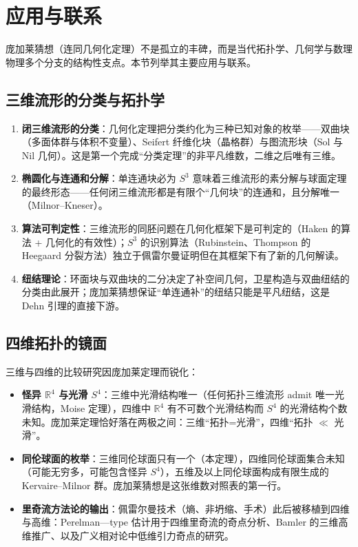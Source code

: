 \section{应用与联系}\label{sec:applications}

庞加莱猜想（连同几何化定理）不是孤立的丰碑，而是当代拓扑学、几何学与数理物理多个分支的结构性支点。本节列举其主要应用与联系。

\subsection{三维流形的分类与拓扑学}

\begin{enumerate}[label=(\arabic*)]
    \item \textbf{闭三维流形的分类}：几何化定理把分类约化为三种已知对象的枚举——双曲块（多面体群与体积不变量）、Seifert 纤维化块（晶格群）与图流形块（Sol 与 Nil 几何）。这是第一个完成“分类定理”的非平凡维数，二维之后唯有三维。
    \item \textbf{椭圆化与连通和分解}：单连通块必为 $S^3$ 意味着三维流形的素分解与球面定理的最终形态——任何闭三维流形都是有限个“几何块”的连通和，且分解唯一（Milnor--Kneser）。
    \item \textbf{算法可判定性}：三维流形的同胚问题在几何化框架下是可判定的（Haken 的算法 + 几何化的有效性）；$S^3$ 的识别算法（Rubinstein、Thompson 的 Heegaard 分裂方法）独立于佩雷尔曼证明但在其框架下有了新的几何解读。
    \item \textbf{纽结理论}：环面块与双曲块的二分决定了补空间几何，卫星构造与双曲纽结的分类由此展开；庞加莱猜想保证“单连通补”的纽结只能是平凡纽结，这是 Dehn 引理的直接下游。
\end{enumerate}

\subsection{四维拓扑的镜面}

三维与四维的比较研究因庞加莱定理而锐化：

\begin{itemize}
    \item \textbf{怪异 $\mathbb{R}^4$ 与光滑 $S^4$}：三维中光滑结构唯一（任何拓扑三维流形 admit 唯一光滑结构，Moise 定理），四维中 $\mathbb{R}^4$ 有不可数个光滑结构而 $S^4$ 的光滑结构个数未知。庞加莱定理恰好落在两极之间：三维“拓扑=光滑”，四维“拓扑 $\ll$ 光滑”。
    \item \textbf{同伦球面的枚举}：三维同伦球面只有一个（本定理），四维同伦球面集合未知（可能无穷多，可能包含怪异 $S^4$），五维及以上同伦球面构成有限生成的 Kervaire--Milnor 群。庞加莱猜想是这张维数对照表的第一行。
    \item \textbf{里奇流方法论的输出}：佩雷尔曼技术（熵、非坍缩、手术）此后被移植到四维与高维：Perelman---type 估计用于四维里奇流的奇点分析、Bamler 的三维高维推广、以及广义相对论中低维引力奇点的研究。
\end{itemize}

